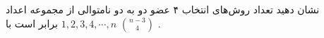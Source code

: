 \p
نشان دهید تعداد روش‌های انتخاب ۴ عضو دو به دو نامتوالی از مجموعه اعداد
$1, 2, 3, 4, \cdots, n$
			 برابر است با 
			 $\binom{n - 3}{4}$
			  .